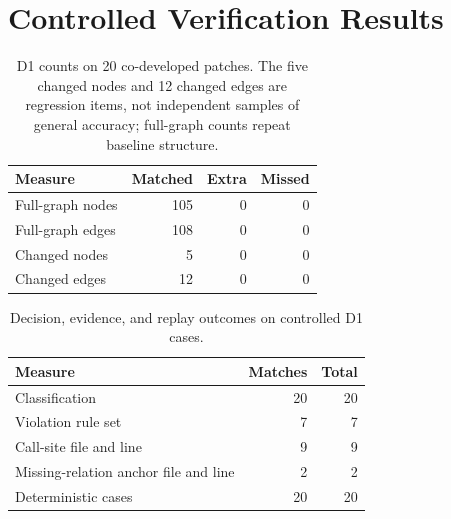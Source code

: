 \section{Controlled Verification Results}

\begin{table}[t]
  \caption{D1 counts on 20 co-developed patches. The five changed nodes and 12 changed edges are regression items, not independent samples of general accuracy; full-graph counts repeat baseline structure.}
  \label{tab:detection-results}
  \centering
  \small
  \begin{tabular}{lrrr}
    \hline
    Measure & Matched & Extra & Missed \\
    \hline
    Full-graph nodes & 105 & 0 & 0 \\
    Full-graph edges & 108 & 0 & 0 \\
    Changed nodes & 5 & 0 & 0 \\
    Changed edges & 12 & 0 & 0 \\
    \hline
  \end{tabular}
\end{table}

\begin{table}[t]
  \caption{Decision, evidence, and replay outcomes on controlled D1 cases.}
  \label{tab:outcome-results}
  \centering
  \small
  \begin{tabular}{lrr}
    \hline
    Measure & Matches & Total \\
    \hline
    Classification & 20 & 20 \\
    Violation rule set & 7 & 7 \\
    Call-site file and line & 9 & 9 \\
    Missing-relation anchor file and line & 2 & 2 \\
    Deterministic cases & 20 & 20 \\
    \hline
  \end{tabular}
\end{table}

